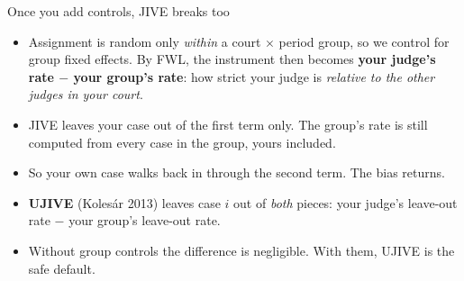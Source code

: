 \documentclass[
  11pt,
  ignorenonframetext,
  aspectratio=169,
]{beamer}
\providecommand{\tightlist}{%
  \setlength{\itemsep}{0pt}\setlength{\parskip}{0pt}}
\begin{document}
\begin{frame}{Once you add controls, JIVE breaks too}
\protect{}\label{once-you-add-controls-jive-breaks-too}
\begin{itemize}
\tightlist
\item
  Assignment is random only \emph{within} a court \(\times\) period
  group, so we control for group fixed effects. By FWL, the instrument
  then becomes \textbf{your judge's rate \(-\) your group's rate}: how
  strict your judge is \emph{relative to the other judges in your
  court}.
\item
  JIVE leaves your case out of the first term only. The group's rate is
  still computed from every case in the group, yours included.
\item
  So your own case walks back in through the second term. The bias
  returns.
\end{itemize}

\vspace{0.4em}

\begin{itemize}
\tightlist
\item
  \textbf{UJIVE} (Kolesár 2013) leaves case \(i\) out of \emph{both}
  pieces: your judge's leave-out rate \(-\) your group's leave-out rate.
\item
  Without group controls the difference is negligible. With them, UJIVE
  is the safe default.
\end{itemize}
\end{frame}
\end{document}
